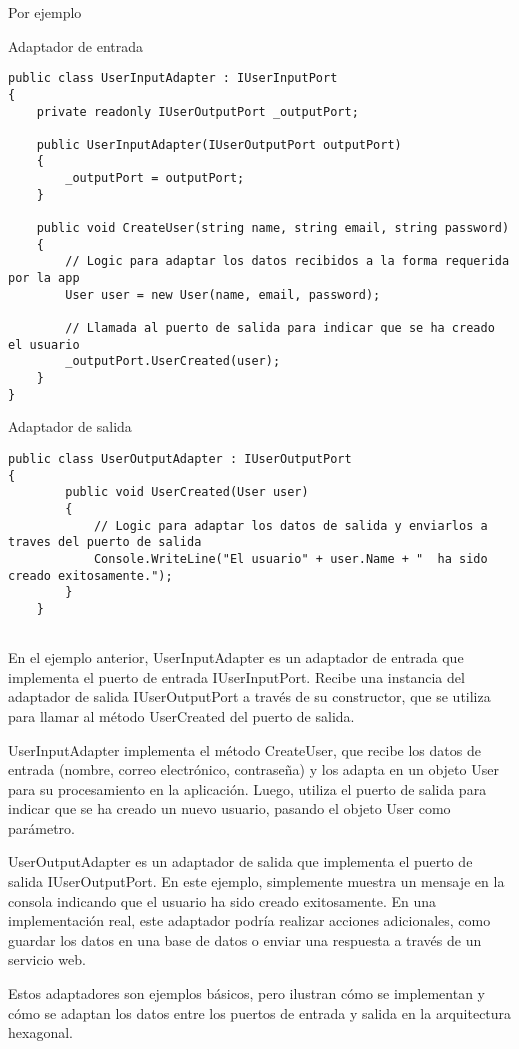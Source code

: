 \documentclass[executivepaper]{article}
\begin{document}
Por ejemplo

Adaptador de entrada
\begin{lstlisting}
public class UserInputAdapter : IUserInputPort
{
    private readonly IUserOutputPort _outputPort;

    public UserInputAdapter(IUserOutputPort outputPort)
    {
        _outputPort = outputPort;
    }

    public void CreateUser(string name, string email, string password)
    {
        // Logic para adaptar los datos recibidos a la forma requerida por la app
        User user = new User(name, email, password);

        // Llamada al puerto de salida para indicar que se ha creado el usuario
        _outputPort.UserCreated(user);
    }
}
\end{lstlisting}

Adaptador de salida
\begin{lstlisting}
public class UserOutputAdapter : IUserOutputPort
{
        public void UserCreated(User user)
        {
            // Logic para adaptar los datos de salida y enviarlos a traves del puerto de salida
            Console.WriteLine("El usuario" + user.Name + "  ha sido creado exitosamente.");
        }
    }
    
\end{lstlisting}

En el ejemplo anterior, UserInputAdapter es un adaptador de entrada que implementa el puerto de entrada IUserInputPort. Recibe una instancia del adaptador de salida IUserOutputPort a través de su constructor, que se utiliza para llamar al método UserCreated del puerto de salida.

UserInputAdapter implementa el método CreateUser, que recibe los datos de entrada (nombre, correo electrónico, contraseña) y los adapta en un objeto User para su procesamiento en la aplicación. Luego, utiliza el puerto de salida para indicar que se ha creado un nuevo usuario, pasando el objeto User como parámetro.

UserOutputAdapter es un adaptador de salida que implementa el puerto de salida IUserOutputPort. En este ejemplo, simplemente muestra un mensaje en la consola indicando que el usuario ha sido creado exitosamente. En una implementación real, este adaptador podría realizar acciones adicionales, como guardar los datos en una base de datos o enviar una respuesta a través de un servicio web.

Estos adaptadores son ejemplos básicos, pero ilustran cómo se implementan y cómo se adaptan los datos entre los puertos de entrada y salida en la arquitectura hexagonal.
\end{document}
